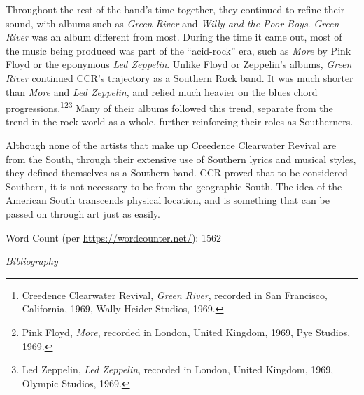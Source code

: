 \documentclass[10pt]{article}
\begin{document}
Throughout the rest of the band's time together, they continued to refine their sound, with albums such as \textit{Green River} and \textit{Willy and the Poor Boys}. \textit{Green River} was an album different from most. During the time it came out, most of the music being produced was part of the ``acid-rock'' era, such as \textit{More} by Pink Floyd or the eponymous \textit{Led Zeppelin}. Unlike Floyd or Zeppelin's albums, \textit{Green River} continued CCR's trajectory as a Southern Rock band. It was much shorter than \textit{More} and \textit{Led Zeppelin}, and relied much heavier on the blues chord progressions.\footnote{Creedence Clearwater Revival, \textit{Green River}, recorded in San Francisco, California, 1969, Wally Heider Studios, 1969.}\footnote{Pink Floyd, \textit{More}, recorded in London, United Kingdom, 1969, Pye Studios, 1969.}\footnote{Led Zeppelin, \textit{Led Zeppelin}, recorded in London, United Kingdom, 1969, Olympic Studios, 1969.} Many of their albums followed this trend, separate from the trend in the rock world as a whole, further reinforcing their roles as Southerners.

Although none of the artists that make up Creedence Clearwater Revival are from the South, through their extensive use of Southern lyrics and musical styles, they defined themselves as a Southern band. CCR proved that to be considered Southern, it is not necessary to be from the geographic South. The idea of the American South transcends physical location, and is something that can be passed on through art just as easily.

\vfill
Word Count (per \url{https://wordcounter.net/}): 1562

\newpage
{}
\singlespacing
\begin{center}
\textit{{\large Bibliography}}
\end{center}
\end{document}
